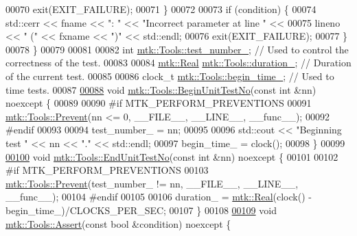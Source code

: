 \begin{DoxyCode}
00070     exit(EXIT\_FAILURE);
00071   \}
00072 
00073   \textcolor{keywordflow}{if} (condition) \{
00074     std::cerr << fname << \textcolor{stringliteral}{": "} << \textcolor{stringliteral}{"Incorrect parameter at line "} <<
00075     lineno << \textcolor{stringliteral}{" ("} << fxname << \textcolor{stringliteral}{")"} << std::endl;
00076     exit(EXIT\_FAILURE);
00077   \}
00078 \}
00079 
00081 
00082 \textcolor{keywordtype}{int} \hyperlink{classmtk_1_1Tools_a04a60458594336ee1badff79b8a9a77f}{mtk::Tools::test\_number\_};  \textcolor{comment}{// Used to control the correctness of the test.}
00083 
00084 \hyperlink{group__c01-roots_gac080bbbf5cbb5502c9f00405f894857d}{mtk::Real} \hyperlink{classmtk_1_1Tools_aba9d3d2952a3de9e7b46faa86d28d692}{mtk::Tools::duration\_};  \textcolor{comment}{// Duration of the current test.}
00085 
00086 clock\_t \hyperlink{classmtk_1_1Tools_a4bd58d08397db42271ed9e2d3ecc9963}{mtk::Tools::begin\_time\_};  \textcolor{comment}{// Used to time tests.}
00087 
\hypertarget{mtk__tools_8cc_source_l00088}{}\hyperlink{classmtk_1_1Tools_afc29ecaf337a13ed2e817d3890a5a441}{00088} \textcolor{keywordtype}{void} \hyperlink{classmtk_1_1Tools_afc29ecaf337a13ed2e817d3890a5a441}{mtk::Tools::BeginUnitTestNo}(\textcolor{keyword}{const} \textcolor{keywordtype}{int} &nn) noexcept \{
00089 
00090 \textcolor{preprocessor}{  #if MTK\_PERFORM\_PREVENTIONS}
00091   \hyperlink{classmtk_1_1Tools_a332324c6f25e66be9dff48c5987a3b9f}{mtk::Tools::Prevent}(nn <= 0, \_\_FILE\_\_, \_\_LINE\_\_, \_\_func\_\_);
00092 \textcolor{preprocessor}{  #endif}
00093 
00094   test\_number\_ = nn;
00095 
00096   std::cout << \textcolor{stringliteral}{"Beginning test "} << nn << \textcolor{stringliteral}{"."} << std::endl;
00097   begin\_time\_ = clock();
00098 \}
00099 
\hypertarget{mtk__tools_8cc_source_l00100}{}\hyperlink{classmtk_1_1Tools_aba67d9dc35c9c1c49430fcc9ea035e03}{00100} \textcolor{keywordtype}{void} \hyperlink{classmtk_1_1Tools_aba67d9dc35c9c1c49430fcc9ea035e03}{mtk::Tools::EndUnitTestNo}(\textcolor{keyword}{const} \textcolor{keywordtype}{int} &nn) noexcept \{
00101 
00102 \textcolor{preprocessor}{  #if MTK\_PERFORM\_PREVENTIONS}
00103   \hyperlink{classmtk_1_1Tools_a332324c6f25e66be9dff48c5987a3b9f}{mtk::Tools::Prevent}(test\_number\_ != nn, \_\_FILE\_\_, \_\_LINE\_\_, \_\_func\_\_);
00104 \textcolor{preprocessor}{  #endif}
00105 
00106   duration\_ = \hyperlink{group__c01-roots_gac080bbbf5cbb5502c9f00405f894857d}{mtk::Real}(clock() - begin\_time\_)/CLOCKS\_PER\_SEC;
00107 \}
00108 
\hypertarget{mtk__tools_8cc_source_l00109}{}\hyperlink{classmtk_1_1Tools_ac6804df469c94ab6a796fb64f1e44a89}{00109} \textcolor{keywordtype}{void} \hyperlink{classmtk_1_1Tools_ac6804df469c94ab6a796fb64f1e44a89}{mtk::Tools::Assert}(\textcolor{keyword}{const} \textcolor{keywordtype}{bool} &condition) noexcept \{

\end{DoxyCode}
